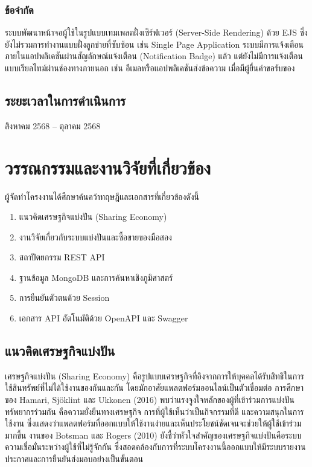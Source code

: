 \documentclass[12pt,a4paper]{report}
\begin{document}
\subsection{ข้อจำกัด}

ระบบพัฒนาหน้าจอผู้ใช้ในรูปแบบเทมเพลตฝั่งเซิร์ฟเวอร์ (Server-Side Rendering) ด้วย EJS ซึ่งยังไม่รวมการทำงานแบบฝั่งลูกข่ายที่ซับซ้อน เช่น Single Page Application ระบบมีการแจ้งเตือนภายในแอปพลิเคชันผ่านสัญลักษณ์แจ้งเตือน (Notification Badge) แล้ว แต่ยังไม่มีการแจ้งเตือนแบบเรียลไทม์ผ่านช่องทางภายนอก เช่น อีเมลหรือแอปพลิเคชันส่งข้อความ เมื่อมีผู้ยื่นคำขอรับของ

\section{ระยะเวลาในการดำเนินการ}

สิงหาคม 2568 -- ตุลาคม 2568

\chapter{วรรณกรรมและงานวิจัยที่เกี่ยวข้อง}

ผู้จัดทำโครงงานได้ศึกษาค้นคว้าทฤษฎีและเอกสารที่เกี่ยวข้องดังนี้

\begin{enumerate}[label=\arabic*., leftmargin=2.5em, itemsep=0.2em]
  \item แนวคิดเศรษฐกิจแบ่งปัน (Sharing Economy)
  \item งานวิจัยเกี่ยวกับระบบแบ่งปันและซื้อขายของมือสอง
  \item สถาปัตยกรรม REST API
  \item ฐานข้อมูล MongoDB และการค้นหาเชิงภูมิศาสตร์
  \item การยืนยันตัวตนด้วย Session
  \item เอกสาร API อัตโนมัติด้วย OpenAPI และ Swagger
\end{enumerate}

\section{แนวคิดเศรษฐกิจแบ่งปัน}

เศรษฐกิจแบ่งปัน (Sharing Economy) คือรูปแบบเศรษฐกิจที่อิงจากการให้บุคคลได้รับสิทธิในการใช้สินทรัพย์ที่ไม่ได้ใช้งานของกันและกัน โดยมักอาศัยแพลตฟอร์มออนไลน์เป็นตัวเชื่อมต่อ การศึกษาของ Hamari, Sj\"oklint และ Ukkonen (2016) พบว่าแรงจูงใจหลักของผู้ที่เข้าร่วมการแบ่งปันทรัพยากรร่วมกัน คือความยั่งยืนทางเศรษฐกิจ การที่ผู้ใช้เห็นว่าเป็นกิจกรรมที่ดี และความสนุกในการใช้งาน ซึ่งแสดงว่าแพลตฟอร์มที่ออกแบบให้ใช้งานง่ายและเห็นประโยชน์ชัดเจนจะช่วยให้ผู้ใช้เข้าร่วมมากขึ้น งานของ Botsman และ Rogers (2010) ยังชี้ว่าหัวใจสำคัญของเศรษฐกิจแบ่งปันคือระบบความเชื่อมั่นระหว่างผู้ใช้ที่ไม่รู้จักกัน ซึ่งสอดคล้องกับการที่ระบบโครงงานนี้ออกแบบให้มีระบบรายงานประกาศและการยืนยันส่งมอบอย่างเป็นขั้นตอน
\end{document}
